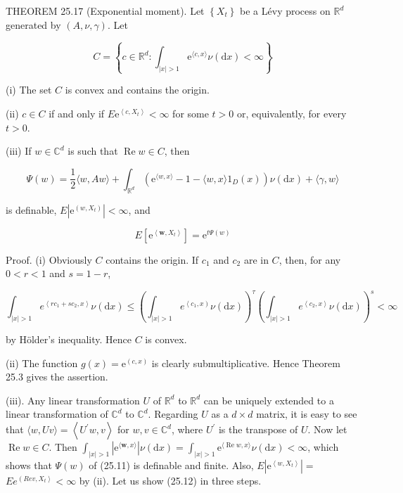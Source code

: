 \documentclass[a4paper,12pt]{article}
\begin{document}
THEOREM 25.17 (Exponential moment). Let $\left\{X_{t}\right\}$ be a Lévy process on $\mathbb{R}^{d}$ generated by $(A, \nu, \gamma)$. Let

$$
    C=\left\{c \in \mathbb{R}^{d}: \int_{|x|>1} \mathrm{e}^{\langle c, x\rangle} \nu(\mathrm{d} x)<\infty\right\}
$$

(i) The set $C$ is convex and contains the origin.

(ii) $c \in C$ if and only if $E \mathrm{e}^{\left\langle c, X_{t}\right\rangle}<\infty$ for some $t>0$ or, equivalently, for every $t>0$.

(iii) If $w \in \mathbb{C}^{d}$ is such that $\operatorname{Re} w \in C$, then


\begin{equation*}
    \Psi(w)=\frac{1}{2}\langle w, A w\rangle+\int_{\mathbb{R}^{d}}\left(\mathrm{e}^{\langle w, x\rangle}-1-\langle w, x\rangle 1_{D}(x)\right) \nu(\mathrm{d} x)+\langle\gamma, w\rangle \tag{25.11}
\end{equation*}


is definable, $E\left|\mathrm{e}^{\left(w, X_{t}\right)}\right|<\infty$, and


\begin{equation*}
    E\left[\mathrm{e}^{\left\langle\boldsymbol{w}, X_{t}\right\rangle}\right]=\mathrm{e}^{t \Psi(w)} \tag{25.12}
\end{equation*}


Proof. (i) Obviously $C$ contains the origin. If $c_{1}$ and $c_{2}$ are in $C$, then, for any $0<r<1$ and $s=1-r$,

$$
    \int_{|x|>1} e^{\left\langle r c_{1}+s c_{2}, x\right\rangle} \nu(\mathrm{d} x) \leq\left(\int_{|x|>1} e^{\left\langle c_{1}, x\right)} \nu(\mathrm{d} x)\right)^{\tau}\left(\int_{|x|>1} e^{\left\langle c_{2}, x\right\rangle} \nu(\mathrm{d} x)\right)^{s}<\infty
$$

by Hölder's inequality. Hence $C$ is convex.

(ii) The function $g(x)=\mathrm{e}^{(c, x)}$ is clearly submultiplicative. Hence Theorem 25.3 gives the assertion.

(iii). Any linear transformation $U$ of $\mathbb{R}^{d}$ to $\mathbb{R}^{d}$ can be uniquely extended to a linear transformation of $\mathbb{C}^{d}$ to $\mathbb{C}^{d}$. Regarding $U$ as a $d \times d$ matrix, it is easy to see that $\langle w, U v\rangle=\left\langle U^{\prime} w, v\right\rangle$ for $w, v \in \mathbb{C}^{d}$, where $U^{\prime}$ is the transpose of $U$. Now let $\operatorname{Re} w \in C$. Then $\int_{|x|>1}\left|\mathrm{e}^{\langle\boldsymbol{w}, x\rangle}\right| \nu(\mathrm{d} x)=\int_{|x|>1} \mathrm{e}^{\langle\operatorname{Re} w, x\rangle} \nu(\mathrm{d} x)<\infty$, which shows that $\Psi(w)$ of (25.11) is definable and finite. Also, $E\left|\mathrm{e}^{\left\langle w, X_{t}\right\rangle}\right|=$ $E e^{\left(R e v, X_{t}\right\rangle}<\infty$ by (ii). Let us show (25.12) in three steps.
\end{document}
